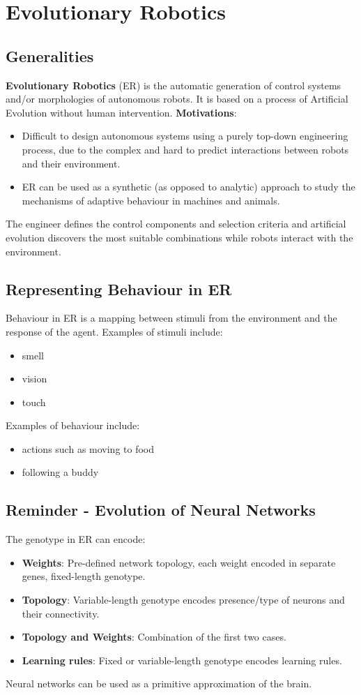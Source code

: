 \section{Evolutionary Robotics}
\subsection*{Generalities}
\textbf{Evolutionary Robotics} (ER) is the automatic generation of control systems and/or morphologies of autonomous robots. It is based on a process of Artificial Evolution without human intervention.
\textbf{Motivations}:
\begin{itemize}
    \item Difficult to design autonomous systems using a purely top-down engineering process, due to the complex and hard to predict interactions between robots and their environment.
    \item ER can be used as a synthetic (as opposed to analytic) approach to study the mechanisms of adaptive behaviour in machines and animals.
\end{itemize}
The engineer defines the control components and selection criteria and artificial evolution discovers the most suitable combinations while robots interact with the environment.

\subsection*{Representing Behaviour in ER}
Behaviour in ER is a mapping between stimuli from the environment and the response of the agent.
Examples of stimuli include:
\begin{itemize}
    \item smell
    \item vision
    \item touch
\end{itemize}
Examples of behaviour include:
\begin{itemize}
    \item actions such as moving to food
    \item following a buddy
\end{itemize}

\subsection*{Reminder - Evolution of Neural Networks}
The genotype in ER can encode:
\begin{itemize}
    \item \textbf{Weights}: Pre-defined network topology, each weight encoded in separate genes, fixed-length genotype.
    \item \textbf{Topology}: Variable-length genotype encodes presence/type of neurons and their connectivity.
    \item \textbf{Topology and Weights}: Combination of the first two cases.
    \item \textbf{Learning rules}: Fixed or variable-length genotype encodes learning rules.
\end{itemize}
Neural networks can be used as a primitive approximation of the brain.

